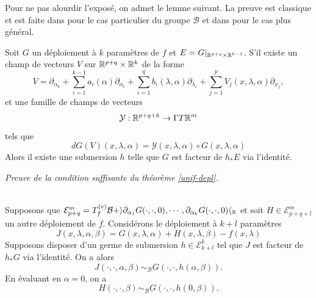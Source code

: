 \documentclass[memoire.tex]{subfiles}
\begin{document}
Pour ne pas alourdir 
l'exposé, on admet le lemme 
suivant. La preuve est 
classique et est faite dans 
\cite{golubitsky1979theory} pour le cas 
particulier du groupe 
$\mathcal{B}$ et dans 
\cite{Martinet1976Deploiements} pour le cas plus 
général.

\begin{lemme}
Soit $G$ un déploiement à $k$ paramètres de $f$ et $E=G|_{\mathbb{R}^{p+q}\times\mathbb{R}^{k-1}}$. S'il existe un champ de vecteurs $V$ sur $\mathbb{R}^{p+q}\times \mathbb{R}^k$ de la forme
\begin{equation*}
    V=\partial_{\alpha_k}+
    \sum_{i=1}^{k-1}a_i(\alpha)\partial_{\alpha_i}+
    \sum_{i=1}^{q}b_i(\lambda,\alpha)\partial_{\lambda_i}
    +\sum_{j=1}^{p}V_j(x,\lambda,\alpha)\partial_{x_j},
\end{equation*}
 et une famille de champs de vecteurs
\begin{equation*}
    \mathcal{Y}: \mathbb{R}^{p+q+k}\rightarrow \Gamma T\mathbb{R}^m
\end{equation*}
tels que
\begin{equation}\label{vect-field}
    dG(V)(x,\lambda,\alpha)=
    \mathcal{Y}(x,\lambda,\alpha)\circ G(x,\lambda,\alpha)
\end{equation}
Alors il existe une submersion $h$ telle que $G$ est facteur de $h_{*}E$ via l'identité.
\end{lemme}
{\hypersetup{linkcolor=color-prop}\par\noindent\textcolor{color-prop}{\textit{Preuve de la condition suffisante du théorème \ref{unif-depl}.}}\ }\\
Supposons que $    \mathcal{E}^m_{p+q}=T^{(e)}_f\mathcal{B}+ \rangle \partial_{\alpha_1}G(\cdot,\cdot,0),\cdots, \partial_{\alpha_k}G(\cdot,\cdot,0)\langle_{\mathbb{R}}$ et soit $H\in\mathcal{E}_{p+q+l}^m$ un autre déploiement de $f$. Considérons le déploiement à $k+l$ paramètres
\begin{equation*}
    J(x,\lambda,\alpha,\beta)=G(x,\lambda,\alpha)+H(x,\lambda,\beta)-f(x,\lambda)
\end{equation*}
Supposons disposer d'un germe de submersion $h\in\mathcal{E}_{k+l}^k$ tel que $J$ est facteur de $h_{*}G$ via l'identité. On a alors
\begin{equation*}
    J(\cdot, \cdot, \alpha, \beta) \sim_{\mathcal{B}} G(\cdot, \cdot, h(\alpha, \beta)).
\end{equation*}
 En évaluant en $\alpha=0$, on a
\begin{equation*}
    H(\cdot,\cdot,\beta)\sim_{\mathcal{B}} G(\cdot,\cdot,h(0,\beta)).
\end{equation*}
\end{document}
